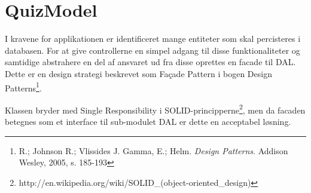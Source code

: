 \section{QuizModel}

I kravene for applikationen er identificeret mange entiteter som skal percisteres i databasen. For at give controllerne en  simpel adgang til disse funktionaliteter og samtidige abstrahere en del af ansvaret ud fra disse oprettes en facade til DAL. Dette er en design strategi beskrevet som Fa\c{c}ade Pattern i bogen Design Patterns\footnote{R.; Johnson R.; Vlissides J. Gamma, E.; Helm. \textit{Design Patterns}. Addison Wesley, 2005, s. 185-193}.

Klassen bryder med Single Responsibility i SOLID-principperne\footnote{http://en.wikipedia.org/wiki/SOLID\_(object-oriented\_design)}, men da facaden betegnes som et interface til sub-modulet DAL er dette en acceptabel løsning.